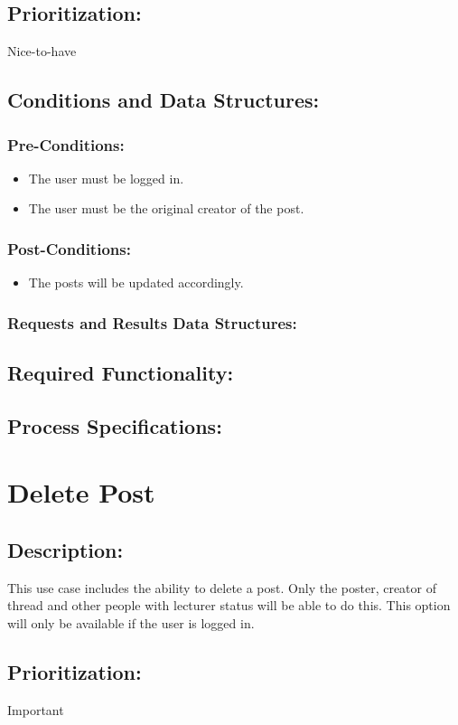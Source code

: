 \documentclass[a4paper,11pt]{article}
\begin{document}
\subsection{Prioritization:} Nice-to-have
\subsection{Conditions and Data Structures:}
\subsubsection*{Pre-Conditions:}
\begin{itemize}
	\item The user must be logged in.
	\item The user must be the original creator of the post.
\end{itemize}
\subsubsection*{Post-Conditions:}
\begin{itemize}
	\item The posts will be updated accordingly.
\end{itemize}
\subsubsection*{Requests and Results Data Structures:}
\subsection{Required Functionality:} 
\subsection{Process Specifications:} 

\section{Delete Post}
\subsection*{Description:}This use case includes the ability to delete a post. Only the poster, creator of thread and other people with lecturer status will be able to do this.
This option will only be available if the user is logged in.
\subsection{Prioritization:}Important
\end{document}
